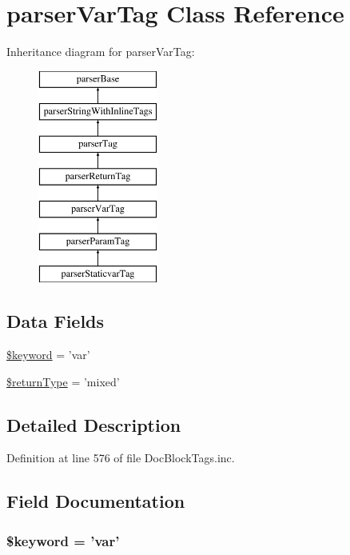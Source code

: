 \hypertarget{classparser_var_tag}{\section{parser\-Var\-Tag \-Class \-Reference}
\label{classparser_var_tag}
}
\-Inheritance diagram for parser\-Var\-Tag\-:\begin{figure}[H]
\begin{center}
\leavevmode
\includegraphics[height=7.000000cm]{classparser_var_tag}
\end{center}
\end{figure}
\subsection*{\-Data \-Fields}
\begin{DoxyCompactItemize}
\item 
\hyperlink{classparser_var_tag_a4a925d6b38bcf3957c713a7d3dc7da1f}{\$keyword} = 'var'
\item 
\hyperlink{classparser_var_tag_a0f317c2c1d4c617554890223a39037be}{\$return\-Type} = 'mixed'
\end{DoxyCompactItemize}


\subsection{\-Detailed \-Description}


\-Definition at line 576 of file \-Doc\-Block\-Tags.\-inc.



\subsection{\-Field \-Documentation}
\hypertarget{classparser_var_tag_a4a925d6b38bcf3957c713a7d3dc7da1f}{
\subsubsection[{\$keyword}]{\setlength{\rightskip}{0pt plus 5cm}\$keyword = 'var'}}\label{classparser_var_tag_a4a925d6b38bcf3957c713a7d3dc7da1f}


